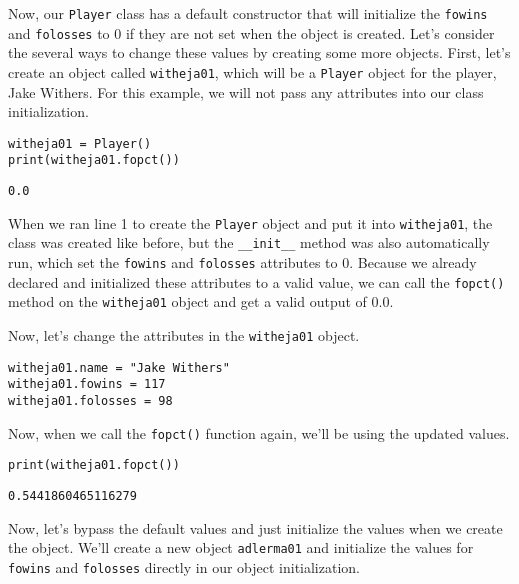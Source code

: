 Now, our \verb|Player| class has a default constructor that will initialize the \verb|fowins| and \verb|folosses| to 0 if they are not set when the object is created. Let's consider the several ways to change these values by creating some more objects. First, let's create an object called \verb|witheja01|, which will be a \verb|Player| object for the player, Jake Withers. For this example, we will not pass any attributes into our class initialization.\par
\begin{lstlisting}[style=pippython]
witheja01 = Player()
print(witheja01.fopct())
\end{lstlisting}
\begin{lstlisting}[style=pippython]
0.0
\end{lstlisting}
When we ran line 1 to create the \verb|Player| object and put it into \verb|witheja01|, the class was created like before, but the \verb|__init__| method was also automatically run, which set the \verb|fowins| and \verb|folosses| attributes to 0. Because we already declared and initialized these attributes to a valid value, we can call the \verb|fopct()| method on the \verb|witheja01| object and get a valid output of 0.0.\par
Now, let's change the attributes in the \verb|witheja01| object.\par
\begin{lstlisting}[style=pippython]
witheja01.name = "Jake Withers"
witheja01.fowins = 117
witheja01.folosses = 98
\end{lstlisting}
Now, when we call the \verb|fopct()| function again, we'll be using the updated values.
\begin{lstlisting}[style=pippython]
print(witheja01.fopct())
\end{lstlisting}
\begin{lstlisting}[style=none]
0.5441860465116279
\end{lstlisting}
Now, let's bypass the default values and just initialize the values when we create the object. We'll create a new object \verb|adlerma01| and initialize the values for \verb|fowins| and \verb|folosses| directly in our object initialization.\par
